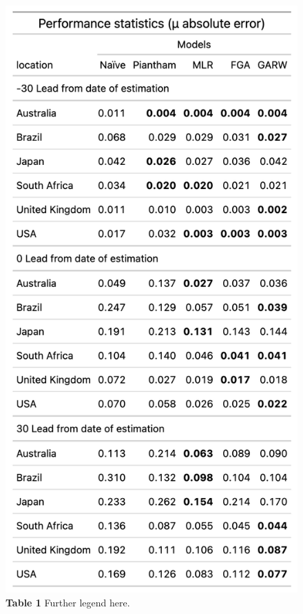 \documentclass[11pt,oneside,letterpaper]{article}
\begin{document}
\begin{figure}[h]
	\centering
	\includegraphics[width=1.0\textwidth]{figures/table1.png}
	\caption{\textbf{Table 1}
	Further legend here.
	}
	\label{table1}
\end{figure}
\end{document}
